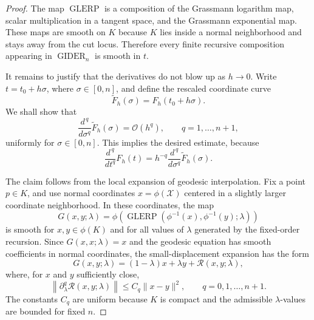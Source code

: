 \documentclass[a4paper,11pt]{article}
\newcommand{\GLERP}{\operatorname{GLERP}}
\newcommand{\GIDER}{\operatorname{GIDER}}
\numberwithin{equation}{section}
\theoremstyle{plain}
\theoremstyle{definition}
\theoremstyle{remark}
\begin{document}
\begin{proof}
The map \(\GLERP\) is a composition of the Grassmann logarithm map, scalar multiplication in a tangent space, and the Grassmann exponential map.  These maps are smooth on \(K\) because \(K\) lies inside a normal neighborhood and stays away from the cut locus.  Therefore every finite recursive composition appearing in \(\GIDER_n\) is smooth in \(t\).

It remains to justify that the derivatives do not blow up as \(h\to0\).  Write \(t=t_0+h\sigma\), where \(\sigma\in[0,n]\), and define the rescaled coordinate curve
\[
    \widetilde F_h(\sigma)
    =
    F_h(t_0+h\sigma).
\]
We shall show that
\[
    \frac{d^{\,q}}{d\sigma^{q}}\widetilde F_h(\sigma)
    =
    \mathcal{O}(h^q),
    \qquad q=1,\ldots,n+1,
\]
uniformly for \(\sigma\in[0,n]\).  This implies the desired estimate, because
\[
    \frac{d^{\,q}}{dt^q}F_h(t)
    =
    h^{-q}
    \frac{d^{\,q}}{d\sigma^q}\widetilde F_h(\sigma).
\]

The claim follows from the local expansion of geodesic interpolation.  Fix a point \(p\in K\), and use normal coordinates \(x=\phi(\mathcal{X})\) centered in a slightly larger coordinate neighborhood.  In these coordinates, the map
\[
    G(x,y;\lambda)
    =
    \phi\left(
        \GLERP(\phi^{-1}(x),\phi^{-1}(y);\lambda)
    \right)
\]
is smooth for \(x,y\in\phi(K)\) and for all values of \(\lambda\) generated by the fixed-order recursion.  Since \(G(x,x;\lambda)=x\) and the geodesic equation has smooth coefficients in normal coordinates, the small-displacement expansion has the form
\[
    G(x,y;\lambda)
    =
    (1-\lambda)x+\lambda y
    +
    \mathcal{R}(x,y;\lambda),
\]
where, for \(x\) and \(y\) sufficiently close,
\[
    \left\|\partial_\lambda^q \mathcal{R}(x,y;\lambda)\right\|
    \le
    C_q\|x-y\|^2,
    \qquad q=0,1,\ldots,n+1.
\]
The constants \(C_q\) are uniform because \(K\) is compact and the admissible \(\lambda\)-values are bounded for fixed \(n\).


\end{proof}
\end{document}
